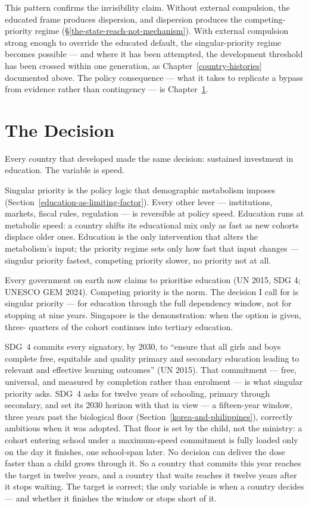 \documentclass[12pt,letterpaper]{article}
\begin{document}
This pattern confirms the invisibility claim. Without external
compulsion, the educated frame produces dispersion, and dispersion
produces the competing-priority regime (\S\ref{the-state-reach-not-mechanism}).
With external compulsion strong enough to override the educated
default, the singular-priority regime becomes possible --- and where
it has been attempted, the development threshold has been crossed
within one generation, as Chapter~\ref{country-histories} documented above.
The policy consequence --- what it takes to replicate a bypass from
evidence rather than contingency --- is Chapter~\ref{the-decision}.

\section{The Decision}\label{the-decision}

Every country that developed made the same decision: sustained
investment in education. The variable is speed.

Singular priority is the policy logic that demographic metabolism
imposes (Section~\ref{education-as-limiting-factor}). Every other
lever --- institutions, markets, fiscal rules, regulation --- is
reversible at policy speed. Education runs at metabolic speed: a
country shifts its educational mix only as fast as new cohorts
displace older ones. Education is the only intervention
that alters the metabolism's input; the priority regime sets only
how fast that input changes --- singular priority fastest,
competing priority slower, no priority not at all.

Every government on earth now claims to prioritise education (UN
2015, SDG 4; UNESCO GEM 2024). Competing priority is the norm. The
decision I call for is singular priority --- for education through
the full dependency window, not for stopping at nine years.
Singapore is the demonstration: when the option is given, three-
quarters of the cohort continues into tertiary education.

SDG~4 commits every signatory, by 2030, to ``ensure that all girls and
boys complete free, equitable and quality primary and secondary
education leading to relevant and effective learning outcomes'' (UN
2015). That commitment --- free, universal, and measured by completion
rather than enrolment --- is what singular priority asks.
SDG~4 asks for twelve years of schooling, primary through secondary,
and set its 2030 horizon with that in view --- a fifteen-year window,
three years past the biological floor
(Section~\ref{korea-and-philippines}), correctly ambitious when it was
adopted. That floor is set by the child, not the ministry: a cohort
entering school under a maximum-speed commitment is fully loaded only
on the day it finishes, one school-span later. No decision can deliver
the dose faster than a child grows through it. So a country that
commits this year reaches the target in twelve years, and a country
that waits reaches it twelve years after it stops waiting. The target
is correct; the only variable is when a country decides --- and whether
it finishes the window or stops short of it.
\end{document}
